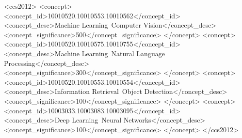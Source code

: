 \documentclass[sigconf,natbib=true,anonymous=true]{acmart}
\newcommand{\todokdinline}[1]{\todo[color=red!20,inline]{{KD: \small #1}}}
\begin{document}
\begin{CCSXML}
<ccs2012>
 <concept>
  <concept_id>10010520.10010553.10010562</concept_id>
  <concept_desc>Machine Learning~Computer Vision</concept_desc>
  <concept_significance>500</concept_significance>
 </concept>
 <concept>
  <concept_id>10010520.10010575.10010755</concept_id>
  <concept_desc>Machine Learning~Natural Language Processing</concept_desc>
  <concept_significance>300</concept_significance>
 </concept>
 <concept>
  <concept_id>10010520.10010553.10010554</concept_id>
  <concept_desc>Information Retrieval~Object Detection</concept_desc>
  <concept_significance>100</concept_significance>
 </concept>
 <concept>
  <concept_id>10003033.10003083.10003095</concept_id>
  <concept_desc>Deep Learning~Neural Networks</concept_desc>
  <concept_significance>100</concept_significance>
 </concept>
</ccs2012>
\end{CCSXML}

\maketitle
\end{document}
